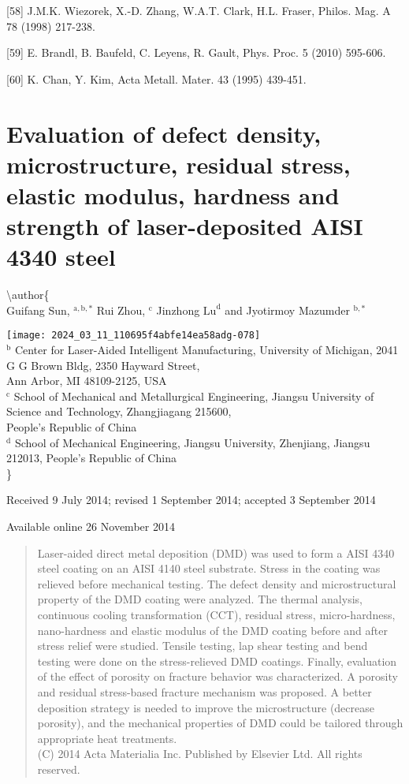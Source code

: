 \documentclass[10pt]{article}
\begin{document}
[58] J.M.K. Wiezorek, X.-D. Zhang, W.A.T. Clark, H.L. Fraser, Philos. Mag. A 78 (1998) 217-238.

[59] E. Brandl, B. Baufeld, C. Leyens, R. Gault, Phys. Proc. 5 (2010) 595-606.

[60] K. Chan, Y. Kim, Acta Metall. Mater. 43 (1995) 439-451.

\section*{Evaluation of defect density, microstructure, residual stress, elastic modulus, hardness and strength of laser-deposited AISI 4340 steel }
\textbackslash author\{\\
Guifang Sun, ${ }^{\mathrm{a}, \mathrm{b}, *}$ Rui Zhou, ${ }^{\mathrm{c}}$ Jinzhong $\mathrm{Lu}^{\mathrm{d}}$ and Jyotirmoy Mazumder ${ }^{\mathrm{b}, *}$

\texttt{[image: 2024\_03\_11\_110695f4abfe14ea58adg-078]} \\
 ${ }^{\mathrm{b}}$ Center for Laser-Aided Intelligent Manufacturing, University of Michigan, 2041 G G Brown Bldg, 2350 Hayward Street, \\
 Ann Arbor, MI 48109-2125, USA \\
 ${ }^{\mathrm{c}}$ School of Mechanical and Metallurgical Engineering, Jiangsu University of Science and Technology, Zhangjiagang 215600, \\
 People's Republic of China \\
 ${ }^{\mathrm{d}}$ School of Mechanical Engineering, Jiangsu University, Zhenjiang, Jiangsu 212013, People's Republic of China\\
\}

Received 9 July 2014; revised 1 September 2014; accepted 3 September 2014

Available online 26 November 2014

\begin{abstract}
Laser-aided direct metal deposition (DMD) was used to form a AISI 4340 steel coating on an AISI 4140 steel substrate. Stress in the coating was relieved before mechanical testing. The defect density and microstructural property of the DMD coating were analyzed. The thermal analysis, continuous cooling transformation (CCT), residual stress, micro-hardness, nano-hardness and elastic modulus of the DMD coating before and after stress relief were studied. Tensile testing, lap shear testing and bend testing were done on the stress-relieved DMD coatings. Finally, evaluation of the effect of porosity on fracture behavior was characterized. A porosity and residual stress-based fracture mechanism was proposed. A better deposition strategy is needed to improve the microstructure (decrease porosity), and the mechanical properties of DMD could be tailored through appropriate heat treatments.\\
(C) 2014 Acta Materialia Inc. Published by Elsevier Ltd. All rights reserved.
\end{abstract}
\end{document}
